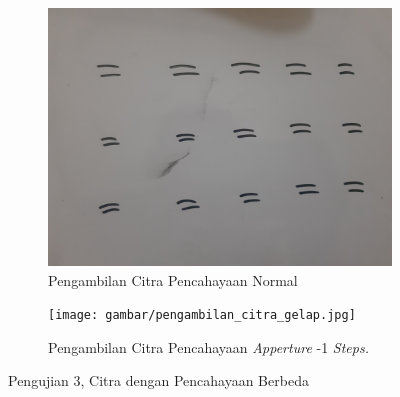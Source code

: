 \begin{figure}[H]
  \begin{subfigure}{.5\textwidth}
    \centering
    \captionsetup{width=.8\linewidth}
    \includegraphics[width=.85\linewidth]{gambar/pengambilan_citra_terang.jpg}
    \caption{Pengambilan Citra Pencahayaan Normal}
    \label{fig:3citracahaya0}
  \end{subfigure}%
  \begin{subfigure}{.5\textwidth}
    \centering
    \captionsetup{width=.8\linewidth}
    \texttt{[image: gambar/pengambilan\_citra\_gelap.jpg]}
    \caption{Pengambilan Citra Pencahayaan \textit{Apperture} -1 \textit{Steps.}}
    \label{fig:3citracahayamin10}
  \end{subfigure}
  \caption{Pengujian 3, Citra dengan Pencahayaan Berbeda}
  \label{fig:citracahayavariasi3}
\end{figure}




